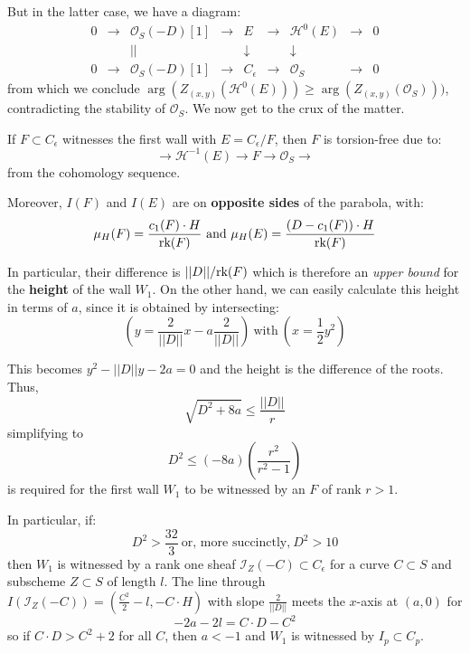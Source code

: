 \documentclass{amsart}
\begin{document}
But in the latter case, we have a diagram: 
\[ \begin{array}{ccccccccccc} 0 & \rightarrow &  {\mathcal O}_S(-D)[1] & \rightarrow & E & \rightarrow & {\mathcal H}^0(E) & \rightarrow & 0 \\
&& || && \downarrow && \downarrow \\
0 & \rightarrow &  {\mathcal O}_S(-D)[1]  & \rightarrow & C_\epsilon & \rightarrow & {\mathcal O}_S & \rightarrow & 0 \end{array} \] 
from which we conclude $\arg(Z_{(x,y)}({\mathcal H}^0(E))) \ge \arg(Z_{(x,y)}({\mathcal O}_S)))$, contradicting the stability of ${\mathcal O}_S$.  
We now get to the crux of the matter. 

\medskip

If
 $F \subset  C_\epsilon$  
witnesses the first wall with $E = C_\epsilon/F$, then $F$ is torsion-free due to: 
 \[ \rightarrow {\mathcal H}^{-1}(E) \rightarrow F \rightarrow {\mathcal O}_S \rightarrow \] 
 from the cohomology sequence. 
 
 \medskip
 
 Moreover, $I(F)$ and $I(E)$ are  on {\bf opposite sides} of the parabola, with: 
\[ \mu_H(F) = \frac{c_1(F)\cdot H}{\mbox{rk}(F)} \ \mbox{and} \ \mu_H(E) = \frac{(D - c_1(F)) \cdot H}{\mbox{rk}(F)}  \] 

In particular, their difference  is 
${ ||D||}/{\mbox{rk}(F)}$ 
which is therefore an {\it upper bound} for  the {\bf height} of the wall $W_1$. On the other hand, we can easily calculate this height in terms of $a$, since it 
is obtained by intersecting: 
\[ \left(y = \frac 2{||D||}x - a \frac 2{||D||}\right) \ \mbox{with} \ \left(x = \frac 12 y^2 \right) \]   

This becomes $y^2 - ||D|| y - 2a = 0$
and the height is the difference of the roots. Thus,  
\[ \sqrt{D^2 + 8a} \le \frac{||D||}r \] 
simplifying to
\[ D^2 \le (-8a) \left( \frac {r^2}{r^2 - 1}\right)  \] 
is required for the first wall $W_1$ to be witnessed by an $F$ of rank $r > 1$. 

\medskip

In particular, if:
\[ D^2 > \frac{32}{3}  \ \mbox{or, more succinctly,} \ D^2 > 10 \] 
then $W_1$ is witnessed by a rank one sheaf ${\mathcal I}_Z(-C) \subset C_\epsilon$ for a curve $C \subset S$ and subscheme $Z \subset S$ of length $l$. The
line through $I({\mathcal I}_Z(-C)) = \left( \frac {C^2}2 - l, - C \cdot H \right)$ with slope $ \frac 2{||D||}$
meets the $x$-axis at $(a,0)$ for  
\[ -2a - 2l = C \cdot D - C^2 \]  
so if $C \cdot D > C^2 + 2$ for all $C$, then $a < -1$ and $W_1$ is witnessed by $I_p \subset C_p$. 
\end{document}

